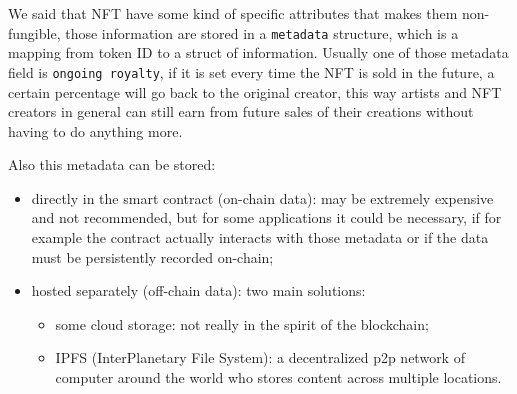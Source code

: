 We said that NFT have some kind of specific attributes that makes them non-fungible, those information are stored in a \verb|metadata| structure, which is a mapping from token ID to a struct of information.
Usually one of those metadata field is \verb|ongoing royalty|, if it is set every time the NFT is sold in the future, a certain percentage will go back to the original creator, this way artists and NFT creators in general can still earn from future sales of their creations without having to do anything more.

Also this metadata can be stored:
\begin{itemize}
    \item directly in the smart contract (on-chain data): may be extremely expensive and not recommended, but for some applications it could be necessary, if for example the contract actually interacts with those metadata or if the data must be persistently recorded on-chain;
    \item hosted separately (off-chain data): two main solutions:
    \begin{itemize}
        \item some cloud storage: not really in the spirit of the blockchain;
        \item IPFS (InterPlanetary File System): a decentralized p2p network of computer around the world who stores content across multiple locations.
    \end{itemize}
\end{itemize}
